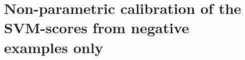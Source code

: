 



    
\section{Non-parametric calibration of the  SVM-scores from negative examples only}
\label{sec:calibration}

